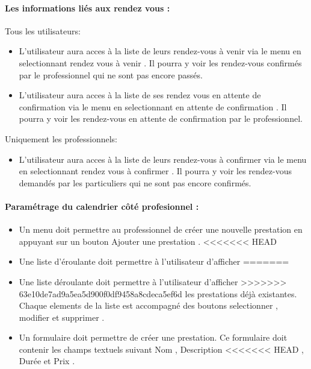 \documentclass{article}
\begin{document}
\begin{itemize}
\begin{itemize}
\end{itemize}

\paragraph{Les informations liés aux rendez vous :}
Tous les utilisateurs:
\begin{itemize}
\item L'utilisateur aura acces à la liste de leurs rendez-vous à venir via le menu en selectionnant \og rendez vous à venir \fg{}.
Il pourra y voir les rendez-vous confirmés par le professionnel qui ne sont pas encore passés.

\item L'utilisateur aura acces à la liste de ses rendez vous en attente de confirmation via le menu en selectionnant \og en attente de confirmation \fg{}.
Il pourra y voir les rendez-vous en attente de confirmation par le professionnel.


\end{itemize}
Uniquement les professionnels:
\begin{itemize}
\item L'utilisateur aura acces à la liste de leurs rendez-vous à confirmer via le menu en selectionnant \og rendez vous à confirmer \fg{}.
Il pourra y voir les rendez-vous demandés par les particuliers qui ne sont pas encore confirmés.

\end{itemize}
\paragraph{Paramétrage du calendrier côté profesionnel :}
\begin{itemize}
\item Un menu doit permettre au professionnel de créer une nouvelle
  prestation en appuyant sur un bouton \og Ajouter une prestation
  \fg{}.
<<<<<<< HEAD
\item Une liste d'éroulante doit permettre à l'utilisateur d'afficher
=======
\item Une liste déroulante doit permettre à l'utilisateur d'afficher
>>>>>>> 63e10de7ad9a5ea5d900f0df9458a8cdeca5ef6d
  les prestations déjà existantes. Chaque elements de la liste est
  accompagné des boutons \og selectionner \fg{}, \og modifier \fg{} et
  \og supprimer \fg{}.

\item Un formulaire doit permettre de créer une prestation. Ce
  formulaire doit contenir les champs textuels suivant \og Nom \fg{}, \og Description
<<<<<<< HEAD
 \fg{},  \og Durée \fg{} et \og Prix \fg{}.


\end{itemize}
\end{itemize}
\end{document}
